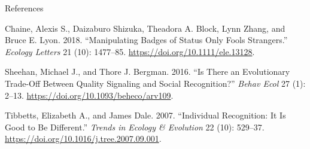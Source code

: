 \documentclass[
  ignorenonframetext,
]{beamer}
\begin{document}
\begin{frame}{References}
\protect\hypertarget{references}{}

\hypertarget{refs}{}
\leavevmode\hypertarget{ref-chaine_Manipulating_2018}{}%
Chaine, Alexis S., Daizaburo Shizuka, Theadora A. Block, Lynn Zhang, and
Bruce E. Lyon. 2018. ``Manipulating Badges of Status Only Fools
Strangers.'' \emph{Ecology Letters} 21 (10): 1477--85.
\url{https://doi.org/10.1111/ele.13128}.

\leavevmode\hypertarget{ref-sheehan_There_2016}{}%
Sheehan, Michael J., and Thore J. Bergman. 2016. ``Is There an
Evolutionary Trade-Off Between Quality Signaling and Social
Recognition?'' \emph{Behav Ecol} 27 (1): 2--13.
\url{https://doi.org/10.1093/beheco/arv109}.

\leavevmode\hypertarget{ref-tibbetts_Individual_2007}{}%
Tibbetts, Elizabeth A., and James Dale. 2007. ``Individual Recognition:
It Is Good to Be Different.'' \emph{Trends in Ecology \& Evolution} 22
(10): 529--37. \url{https://doi.org/10.1016/j.tree.2007.09.001}.

\end{frame}
\end{document}
